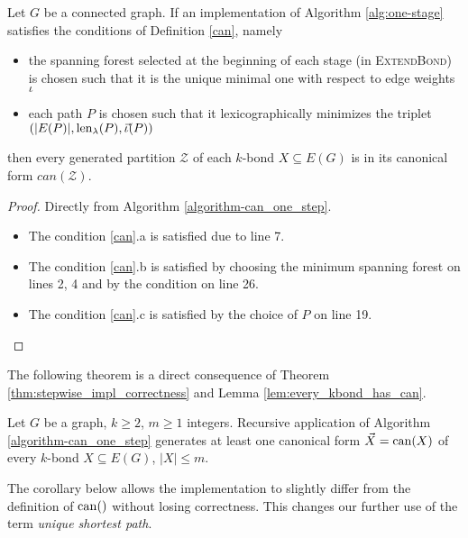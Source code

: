 \begin{lem}
	\label{lem:alg_is_canonical}
	Let $G$ be a connected graph. If an implementation of Algorithm \ref{alg:one-stage} satisfies the conditions of Definition \ref{can}, namely

	\begin{itemize}
		\item the spanning forest selected at the beginning of each stage (in \textsc{ExtendBond}) is chosen such that it is the unique minimal one with respect to edge weights $\iota$
		\item each path $P$ is chosen such that it lexicographically minimizes the triplet $(\lvert E(P) \rvert, \operatorname{len}_\lambda(P), \vec{\iota}(P) )$
	\end{itemize}

	then every generated partition $\mathcal{Z}$ of each $k$-bond $X \subseteq E(G)$ is in its canonical form $can(\mathcal{Z})$.
\end{lem}

\begin{proof}
	Directly from Algorithm \ref{algorithm-can_one_step}.
	\begin{itemize}
		\item The condition \ref{can}.a is satisfied due to line 7.
		\item The condition \ref{can}.b is satisfied by choosing the minimum spanning forest on lines 2, 4 and by the condition on line 26.
		\item The condition \ref{can}.c is satisfied by the choice of $P$ on line 19.
	\end{itemize}
\end{proof}

\noindent The following theorem is a direct consequence of Theorem \ref{thm:stepwise_impl_correctness} and Lemma \ref{lem:every_kbond_has_can}.


\begin{thm}
	Let $G$ be a graph, $k \geq 2$, $m \geq 1$ integers. Recursive application of Algorithm \ref{algorithm-can_one_step} generates at least one canonical form $\vec X = \operatorname{can}(X)$ of every $k$-bond $X \subseteq E(G)$, $\lvert X \rvert \leq m$.
\end{thm}


The corollary below allows the implementation to slightly differ from the definition of $\operatorname{can}()$ without losing correctness. This changes our further use of the term \textit{unique shortest path}.

